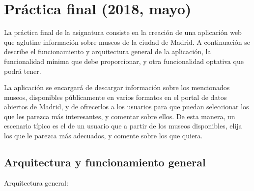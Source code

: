 \newpage

\newpage


\section{Práctica final (2018, mayo)}
\label{practica-final-2018-05}

La práctica final de la asignatura consiste en la creación de una aplicación web que aglutine información sobre museos de la ciudad de Madrid. A continuación se describe el funcionamiento y arquitectura general de la aplicación, la funcionalidad mínima que debe proporcionar, y otra funcionalidad optativa que podrá tener.

La aplicación se encargará de descargar información sobre los mencionados museos, disponibles públicamente en varios formatos en el portal de datos abiertos de Madrid, y de ofrecerlos a los usuarios para que puedan seleccionar los que les parezca más interesantes, y comentar sobre ellos. De esta manera, un escenario típico es el de un usuario que a partir de los museos disponibles, elija los que le parezca más adecuados, y comente sobre los que quiera.

\subsection{Arquitectura y funcionamiento general}

Arquitectura general:

